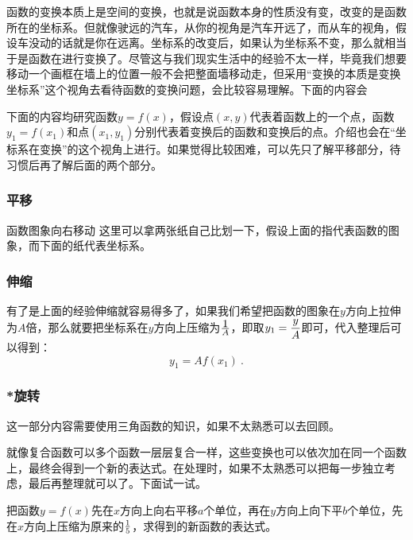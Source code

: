 函数的变换本质上是空间的变换，也就是说函数本身的性质没有变，改变的是函数所在的坐标系。但就像驶远的汽车，从你的视角是汽车开远了，而从车的视角，假设车没动的话就是你在远离。坐标系的改变后，如果认为坐标系不变，那么就相当于是函数在进行变换了。尽管这与我们现实生活中的经验不太一样，毕竟我们想要移动一个画框在墙上的位置一般不会把整面墙移动走，但采用“变换的本质是变换坐标系”这个视角去看待函数的变换问题，会比较容易理解。下面的内容会

下面的内容均研究函数$y=f(x)$，假设点$(x,y)$代表着函数上的一个点，函数$y_1=f(x_1)$和点$(x_1,y_1)$分别代表着变换后的函数和变换后的点。介绍也会在“坐标系在变换”的这个视角上进行。如果觉得比较困难，可以先只了解平移部分，待习惯后再了解后面的两个部分。

\subsubsection{平移}
函数图象向右移动
这里可以拿两张纸自己比划一下，假设上面的指代表函数的图象，而下面的纸代表坐标系。

\subsubsection{伸缩}

有了是上面的经验伸缩就容易得多了，如果我们希望把函数的图象在$y$方向上拉伸为$A$倍，那么就要把坐标系在$y$方向上压缩为$\displaystyle 1\over A$，即取$\displaystyle y_1={y\over A}$即可，代入整理后可以得到：
\begin{equation}
y_1=Af(x_1)~.
\end{equation}

\subsubsection{*旋转}

这一部分内容需要使用三角函数的知识，如果不太熟悉可以去回顾。

就像复合函数可以多个函数一层层复合一样，这些变换也可以依次加在同一个函数上，最终会得到一个新的表达式。在处理时，如果不太熟悉可以把每一步独立考虑，最后再整理就可以了。下面试一试。
\begin{exercise}{把函数$y=f(x)$先在$x$方向上向右平移$a$个单位，再在$y$方向上向下平$b$个单位，先在$x$方向上压缩为原来的$1\over5$，求得到的新函数的表达式。}

\end{exercise}

